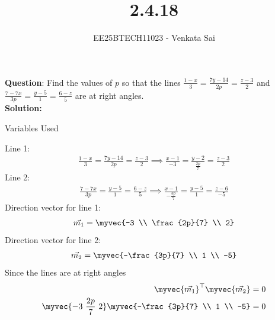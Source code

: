 \documentclass[journal]{IEEEtran}
\begin{document}


\title{2.4.18}
\author{EE25BTECH11023 - Venkata Sai}
{\let\newpage\relax\maketitle}

\renewcommand{\thefigure}{\theenumi}
\renewcommand{\thetable}{\theenumi}
\setlength{\intextsep}{10pt} %


\renewcommand{\thetable}{\theenumi}


\textbf{Question}:\newline
Find the values of $p$ so that the lines $\frac{1-x}{3} = \frac{7y-14}{2p} = \frac{z-3}{2}$ and $\frac{7-7x}{3p} = \frac{y-5}{1} = \frac{6-z}{5}$ are at right angles. 
\\
\textbf{Solution: }
\begin{table}[H]    
  \centering
  
  \caption{Variables Used}
\end{table} 
Line 1:
\begin{align}
\frac{1-x}{3} = \frac{7y-14}{2p} = \frac{z-3}{2} \implies \frac{x-1}{-3} = \frac{y-2}{\frac{2p}{7}} = \frac{z-3}{2}
\end{align}
Line 2:
\begin{align}
\frac{7-7x}{3p} = \frac{y-5}{1} = \frac{6-z}{5} \implies \frac{x-1}{-\frac{3p}{7}} = \frac{y-5}{1} = \frac{z-6}{-5}
\end{align}
Direction vector for line 1:
\begin{align}
\vec{m_1} = \myvec{-3 \\ \frac{2p}{7} \\ 2}
\end{align}
Direction vector for line 2:
\begin{align}
\vec{m_2} = \myvec{-\frac{3p}{7} \\ 1 \\ -5}
\end{align}
Since the lines are at right angles
\begin{align}
\myvec{\vec{m_1}}^\top\myvec{\vec{m_2}} = 0 \\
\myvec{-3 \ \frac{2p}{7} \ 2}\myvec{-\frac{3p}{7} \\ 1 \\ -5}=0
\end{align}
\end{document}

